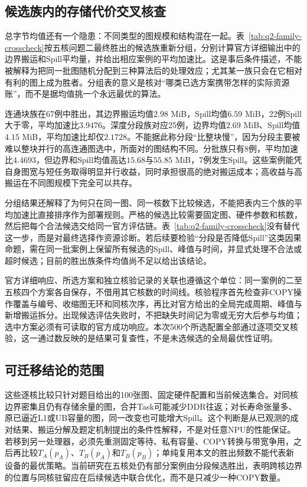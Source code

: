 \subsection{候选族内的存储代价交叉核查}

总字节均值还有一个隐患：不同类型的图规模和结构混在一起。表~\ref{tab:q2-family-crosscheck}按五核问题二最终胜出的候选族重新分组，分别计算官方详细输出中的边界搬运和Spill平均量，并给出相应案例的平均加速比。这是事后条件描述，不能被解释为把同一批图随机分配到三种算法后的处理效应；尤其某一族只会在它相对有利的图上成为胜者。分组表的意义是核对“哪类已选方案携带怎样的实际资源账”，而不是据均值挑一个永远最优的算法。



连通块族在67例中胜出，其边界搬运均值$2.98$ MiB，Spill均值$6.59$ MiB，22例Spill大于零，平均加速比$3.9476$。深度分段族对应25例，边界均值$2.69$ MiB、Spill均值$4.15$ MiB，平均加速比却仅$2.1728$。不能据此称分段“比整块慢”，因为分段主要被难以整块并行的高连通图选中，所面对的图结构不同。分批族只有8例，平均加速比$4.4693$，但边界和Spill均值高达$15.68$与$55.85$ MiB，7例发生Spill。这些案例能凭自身图宽与短任务取得明显并行收益，同时承担很高的绝对搬运成本；高收益与高搬运在不同图规模下完全可以共存。

分组结果还解释了为何只在同一图、同一核数下比较候选，不能把表内三个族的平均加速比直接排序作为部署规则。严格的候选比较需要固定图、硬件参数和核数，然后把每个合法候选交给同一官方评估链。表~\ref{tab:q2-family-crosscheck}没有替代这一步，而是对最终选择作资源诊断。若后续要检验“分段是否降低Spill”这类因果命题，需在同一批案例上保留所有候选的Spill、峰值与时间，并显式处理不合法或超时候选；目前的胜出族条件均值尚不足以给出该结论。

官方详细响应、所选方案和独立核验记录的关联也遵循这个单位：同一案例的二至五核四个方案各自保存，不借用其它核数的时间线。核验程序首先检查非COPY操作覆盖与编号、收缩图无环和同核次序，再比对官方给出的全局完成周期、峰值与新增搬运拆分。出现候选评估失败时，不把缺失时间记为零或无穷大后参与均值；选中方案必须有可读取的官方成功响应。本次500个所选配置全部通过逐项交叉核验，这一通过数反映的是结果可复查性，不是未选候选的全局最优性证明。

\subsection{可迁移结论的范围}

这些逐核比较只针对题目给出的100张图、固定硬件配置和当前候选集合。对同核边界密集且仍有存储余量的图，合并Task可能减少DDR往返；对长寿命张量多、原已逼近L1或UB容量的图，同一改变也可能增大Spill。这个判断是从已观测的成对结果、搬运分解及题定机制提出的条件性解释，不是对任意NPU的性能保证。若移到另一处理器，必须先重测固定等待、私有容量、COPY转换与带宽争用，之后再比较$T_A(p_A)$、$T_B(p_A)$和$T_B(p_B)$；单纯复用本文的胜出频数不能代表新设备的最优策略。当前研究在五核处仍有部分案例由分段候选胜出，表明跨核边界的位置与同核驻留应在后续候选中联合优化，而不是只减少一种COPY数量。

